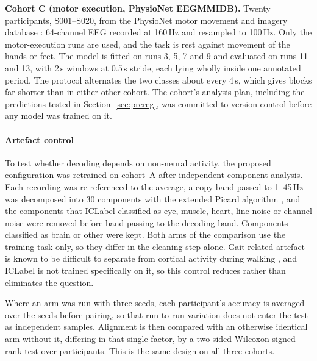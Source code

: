 

\textbf{Cohort C (motor execution, PhysioNet EEGMMIDB).} Twenty participants,
S001--S020, from the PhysioNet motor movement and imagery database
\citep{schalk2004,goldberger2000}: 64-channel EEG recorded at 160\,Hz and
resampled to 100\,Hz. Only the motor-execution runs are used, and the task is
rest against movement of the hands or feet. The model is fitted on runs 3, 5,
7 and 9 and evaluated on runs 11 and 13, with 2\,s windows at 0.5\,s stride,
each lying wholly inside one annotated period. The protocol alternates the two
classes about every 4\,s, which gives blocks far shorter than in either other
cohort. The cohort's analysis plan, including the predictions tested in
Section~\ref{sec:prereg}, was committed to version control before any model
was trained on it.


\paragraph{Artefact control} To test whether decoding depends on non-neural
activity, the proposed configuration was retrained on cohort~A after
independent component analysis. Each recording was re-referenced to the
average, a copy band-passed to 1--45\,Hz was decomposed into 30 components with
the extended Picard algorithm \citep{picard}, and the components that ICLabel
\citep{iclabel} classified as eye, muscle, heart, line noise or channel noise
were removed before band-passing to the decoding band. Components classified as
brain or other were kept. Both arms of the comparison use the training task
only, so they differ in the cleaning step alone. Gait-related artefact is known
to be difficult to separate from cortical activity during walking
\citep{castermans2014,kline2015}, and ICLabel is not trained specifically on
it, so this control reduces rather than eliminates the question.


Where an arm was run with three seeds, each participant's accuracy is averaged
over the seeds before pairing, so that run-to-run variation does not enter the
test as independent samples. Alignment is then compared with an otherwise
identical arm without it, differing in that single factor, by a two-sided
Wilcoxon signed-rank test over participants. This is the same design on all
three cohorts.

